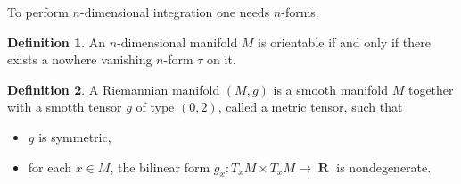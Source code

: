 \documentclass[a4paper]{article}
\DeclareMathOperator{\R}{\mathbf{R}}
\theoremstyle{definition}
\newtheorem{defn}{Definition}
\theoremstyle{plain}
\begin{document}
    To perform $n$-dimensional integration one needs
    $n$-forms.

    \begin{defn}
        An $n$-dimensional manifold $M$ is orientable if and
        only if there exists a nowhere vanishing $n$-form
        $\tau$ on it.
    \end{defn}

    \begin{defn}
        A Riemannian manifold $(M,g)$ is a smooth manifold
        $M$ together with a smotth tensor $g$ of type
        $(0,2)$, called a metric tensor, such that
        \begin{itemize}
            \item $g$ is symmetric,
            \item for each $x \in M$, the bilinear form $g_x
                : T_xM \times T_xM \to \R$ is nondegenerate.
        \end{itemize}
    \end{defn}
\end{document}
